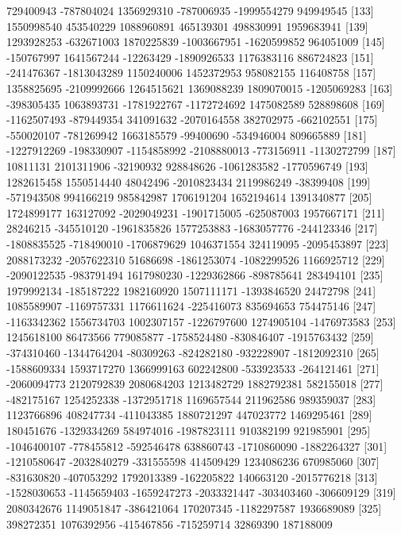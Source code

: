 \documentclass[11pt]{article}
\begin{document}
{\begin{Schunk}
\begin{Soutput}
[127]   729400943  -787804024  1356929310  -787006935 -1999554279   949949545
[133]  1550998540   453540229  1088960891   465139301   498830991  1959683941
[139]  1293928253  -632671003  1870225839 -1003667951 -1620599852   964051009
[145]  -150767997  1641567244   -12263429 -1890926533  1176383116   886724823
[151]  -241476367 -1813043289  1150240006  1452372953   958082155   116408758
[157]  1358825695 -2109992666  1264515621  1369088239  1809070015 -1205069283
[163]  -398305435  1063893731 -1781922767 -1172724692  1475082589   528898608
[169] -1162507493  -879449354   341091632 -2070164558   382702975  -662102551
[175]  -550020107  -781269942  1663185579   -99400690  -534946004   809665889
[181] -1227912269  -198330907 -1154858992 -2108880013  -773156911 -1130272799
[187]    10811131  2101311906   -32190932   928848626 -1061283582 -1770596749
[193]  1282615458  1550514440    48042496 -2010823434  2119986249   -38399408
[199]  -571943508   994166219   985842987  1706191204  1652194614  1391340877
[205]  1724899177   163127092 -2029049231 -1901715005  -625087003  1957667171
[211]    28246215  -345510120 -1961835826  1577253883 -1683057776  -244123346
[217] -1808835525  -718490010 -1706879629  1046371554   324119095 -2095453897
[223]  2088173232 -2057622310    51686698 -1861253074 -1082299526  1166925712
[229] -2090122535  -983791494  1617980230 -1229362866  -898785641   283494101
[235]  1979992134  -185187222  1982160920  1507111171 -1393846520    24472798
[241]  1085589907 -1169757331  1176611624  -225416073   835694653   754475146
[247] -1163342362  1556734703  1002307157 -1226797600  1274905104 -1476973583
[253]  1245618100    86473566   779085877 -1758524480  -830846407 -1915763432
[259]  -374310460 -1344764204   -80309263  -824282180  -932228907 -1812092310
[265] -1588609334  1593717270  1366999163   602242800  -533923533  -264121461
[271] -2060094773  2120792839  2080684203  1213482729  1882792381   582155018
[277]  -482175167  1254252338 -1372951718  1169657544   211962586   989359037
[283]  1123766896   408247734  -411043385  1880721297   447023772  1469295461
[289]   180451676 -1329334269   584974016 -1987823111   910382199   921985901
[295] -1046400107  -778455812  -592546478   638860743 -1710860090 -1882264327
[301] -1210580647 -2032840279  -331555598   414509429  1234086236   670985060
[307]  -831630820  -407053292  1792013389  -162205822   140663120 -2015776218
[313] -1528030653 -1145659403 -1659247273 -2033321447  -303403460  -306609129
[319]  2080342676  1149051847  -386421064   170207345 -1182297587  1936689089
[325]   398272351  1076392956  -415467856  -715259714    32869390   187188009

\end{Soutput}
\end{Schunk}}
\end{document}
